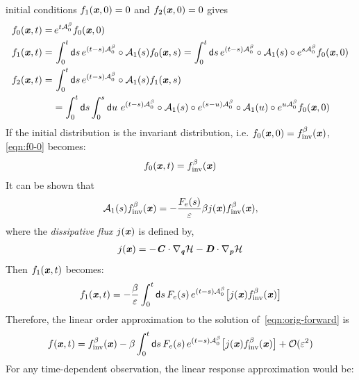 \documentclass[aip,jcp,a4paper,reprint,onecolumn]{revtex4-1}
\newcommand{\vect}[1]{\textbf{\textit{#1}}}
\newcommand{\dd}{\textsf{d}}
\newcommand{\inv}{\textrm{inv}}
\newcommand{\mh}{\mathcal H}
\newcommand{\mo}{\mathcal O}
\newcommand{\fwg}{{\mathcal A}}
\begin{document}
initial conditions $f_1(\vect x, 0) = 0$ and $f_2(\vect x, 0) = 0$
gives
\begin{align}\label{eqn:f0-0}
  f_0(\vect x, t)
  =&\,
  e^{t\fwg^\beta_0}f_0(\vect x, 0) \\\label{eqn:f1-0}
  f_1(\vect x, t)
  =&\,
  \int_0^t\dd s\,
  e^{(t-s)\fwg^\beta_0}\circ
  \fwg_1(s) f_0(\vect x,s)
  =
  \int_0^t\dd s\,
  e^{(t-s)\fwg^\beta_0}\circ
  \fwg_1(s)\circ
  e^{s\fwg^\beta_0}f_0(\vect x, 0) \\\nonumber
  f_2(\vect x, t)
  =&\,
  \int_0^t\dd s\,
  e^{(t-s)\fwg^\beta_0}\circ
  \fwg_1(s) f_1(\vect x,s) \\\label{eqn:f2-0}
  &=
  \int_0^t\dd s
  \int_0^s\dd u\,\,
  e^{(t-s)\fwg^\beta_0}\circ
  \fwg_1(s)\circ
  e^{(s-u)\fwg^\beta_0}\circ
  \fwg_1(u)\circ
  e^{u\fwg^\beta_0}
  f_0(\vect x, 0) 
\end{align}
If the initial distribution is the invariant distribution, i.e.
$f_0(\vect x, 0) = f_{\inv}^\beta(\vect x)$,
\eqref{eqn:f0-0} becomes:
\begin{align}
  f_0(\vect x, t) = f_{\inv}^\beta(\vect x)
\end{align}
It can be shown that
\begin{align}
  \fwg_1(s) f_{\inv}^\beta(\vect x)
  =
  -\frac{F_e(s)}{\varepsilon}\beta
  j(\vect x)
  f_{\inv}^\beta(\vect x),
\end{align}
where the \emph{dissipative flux} $j(\vect x)$ is defined by,
\begin{align}
  j(\vect x) =
  -\vect C\cdot\nabla_{\vect q}\mh 
  -\vect D\cdot\nabla_{\vect p}\mh
\end{align}
Then $f_1(\vect x, t)$ becomes:
\begin{align}
  f_1(\vect x, t)
  =
  -\frac\beta\varepsilon
  \int_0^t\dd s\,
  F_e(s)\,
  e^{(t-s)\fwg^\beta_0}
  \big[
  j(\vect x)
  f_{\inv}^\beta(\vect x)
  \big]
\end{align}
Therefore, the linear order approximation to
the solution of~\eqref{eqn:orig-forward} is 
\begin{align}\label{eqn:solv-orig-linear}
  f(\vect x, t) =
  f_{\inv}^\beta(\vect x)
  - \beta
  \int_0^t\dd s\,
  F_e(s)\,
  e^{(t-s)\fwg^\beta_0}
  \big[
  j(\vect x)
  f_{\inv}^\beta(\vect x)
  \big]
  + \mo(\varepsilon^2)
\end{align}
For any time-dependent observation, the linear response approximation
would be:
\end{document}
